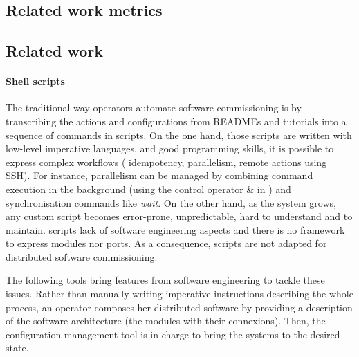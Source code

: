 
\subsection{Related work metrics}


\subsection{Related work}

\paragraph{Shell scripts}
The traditional way operators automate software commissioning is by transcribing
the actions and configurations from READMEs and tutorials into a sequence of
commands in \shell scripts.
On the one hand, those scripts are written with low-level imperative languages,
and good programming skills, it is possible to express complex workflows (\eg
idempotency, parallelism, remote actions using \textsc{SSH}).
For instance, parallelism can be managed by combining command execution in the
background (\eg using the control operator \& in \bash) and synchronisation
commands like \emph{wait}.
On the other hand, as the system grows, any custom script becomes error-prone,
unpredictable, hard to understand and to maintain.
\shell scripts lack of software engineering aspects and there is no framework to
express modules nor ports. As a consequence, \shell scripts are not adapted for
distributed software commissioning.

The following tools bring features from software engineering to tackle these
issues. Rather than manually writing imperative instructions describing the
whole process, an operator composes her distributed software by providing a
description of the software architecture (\ie the modules with their
connexions). Then, the configuration management tool is in charge to bring the
systems to the desired state.

